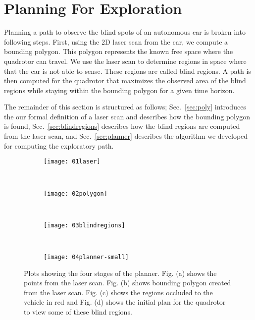 
\section{Planning For Exploration}

Planning a path to observe the blind spots of an autonomous car is broken into
following steps. First, using the 2D laser scan from the car, we compute a
bounding polygon. This polygon represents the known free space where the
quadrotor can travel. We use the laser scan to determine regions in space where
that the car is not able to sense. These regions are called blind regions. A
path is then computed for the quadrotor that maximizes the observed area of the
blind regions while staying within the bounding polygon for a given time
horizon.

The remainder of this section is structured as follows; Sec.~\ref{sec:poly}
introduces the our formal definition of a laser scan and describes how the
bounding polygon is found, Sec.~\ref{sec:blindregions} describes how the blind
regions are computed from the laser scan, and Sec.~\ref{sec:planner} describes
the algorithm we developed for computing the exploratory path.

\begin{figure}[ht]

    \centering

    \begin{subfigure}[t]{0.44\textwidth}
        \centering
        \texttt{[image: 01laser]}
        \caption{}
        \label{fig:01laser}
    \end{subfigure}
    ~
    \begin{subfigure}[t]{0.44\textwidth}
        \centering
        \texttt{[image: 02polygon]}
        \caption{}
        \label{fig:02polygon}
    \end{subfigure}
    ~
    \begin{subfigure}[t]{0.44\textwidth}
        \centering
        \texttt{[image: 03blindregions]}
        \caption{}
        \label{fig:03blindregions}
    \end{subfigure}
    ~
    \begin{subfigure}[t]{0.44\textwidth}
        \centering
        \texttt{[image: 04planner-small]}
        \caption{}
        \label{fig:04planner-small}
    \end{subfigure}

    \caption{Plots showing the four stages of the planner. Fig. (a) shows the
    points from the laser scan. Fig. (b) shows bounding polygon created from
the laser scan. Fig. (c) shows the regions occluded to the vehicle in red and
Fig. (d) shows the initial plan for the quadrotor to view some of these blind
regions.}

    \label{fig:planner-stages}

\end{figure}

